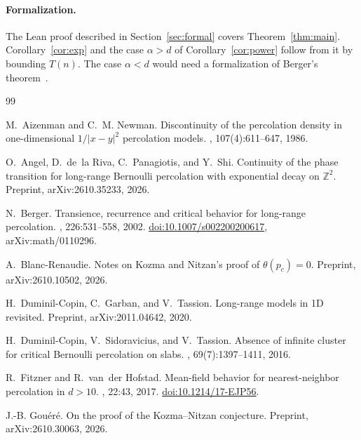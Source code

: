 \documentclass[11pt]{article}
\theoremstyle{definition}
\theoremstyle{remark}
\numberwithin{equation}{section}
\newcommand{\1}{\mathbf 1}
\begin{document}
\paragraph{Formalization.} The Lean proof described in Section~\ref{sec:formal} covers
Theorem~\ref{thm:main}. Corollary~\ref{cor:exp} and the case $\alpha>d$ of Corollary~\ref{cor:power}
follow from it by bounding $T(n)$. The case $\alpha<d$ would need a formalization of Berger's
theorem~\cite{Berger2002}.

{\small\raggedright
\begin{thebibliography}{99}

M.~Aizenman and C.~M. Newman.
\newblock Discontinuity of the percolation density in one-dimensional $1/|x-y|^2$ percolation models.
, 107(4):611--647, 1986.

O.~Angel, D.~de~la Riva, C.~Panagiotis, and Y.~Shi.
\newblock Continuity of the phase transition for long-range {B}ernoulli percolation with exponential decay on $\mathbb{Z}^2$.
\newblock Preprint, arXiv:2610.35233, 2026.

N.~Berger.
\newblock Transience, recurrence and critical behavior for long-range percolation.
, 226:531--558, 2002.
\newblock \href{https://doi.org/10.1007/s002200200617}{doi:10.1007/s002200200617}, arXiv:math/0110296.

A.~Blanc-Renaudie.
\newblock Notes on {K}ozma and {N}itzan's proof of $\theta(p_c)=0$.
\newblock Preprint, arXiv:2610.10502, 2026.

H.~Duminil-Copin, C.~Garban, and V.~Tassion.
\newblock Long-range models in 1{D} revisited.
\newblock Preprint, arXiv:2011.04642, 2020.

H.~Duminil-Copin, V.~Sidoravicius, and V.~Tassion.
\newblock Absence of infinite cluster for critical {B}ernoulli percolation on slabs.
, 69(7):1397--1411, 2016.

R.~Fitzner and R.~van~der Hofstad.
\newblock Mean-field behavior for nearest-neighbor percolation in $d>10$.
, 22:43, 2017.
\newblock \href{https://doi.org/10.1214/17-EJP56}{doi:10.1214/17-EJP56}.

J.-B. Gou{\'e}r{\'e}.
\newblock On the proof of the {K}ozma--{N}itzan conjecture.
\newblock Preprint, arXiv:2610.30063, 2026.


\end{thebibliography}}
\end{document}
